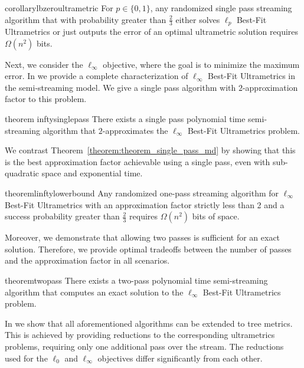 \documentclass{article}
\begin{document}
\begin{restatable}{corollary}{lbzeroultrametric}
    For $p \in \{0,1\}$, any randomized single pass streaming algorithm that with probability greater than $\frac{2}{3}$ either solves $\ell_p$ Best-Fit Ultrametrics or just outputs the error of an optimal ultrametric solution requires $\Omega(n^2)$ bits.
\end{restatable}

Next, we consider the $\ell_\infty$ objective, where the goal is to minimize the maximum error.
In  we provide a complete characterization of $\ell_\infty$ Best-Fit Ultrametrics in the semi-streaming model.
We give a single pass algorithm with $2$-approximation factor to this problem.

\begin{restatable}{theorem}
{inftysinglepass}\label{theorem:theorem_single_pass_md}
There exists a single pass polynomial time semi-streaming algorithm that $2$-approximates the $\ell_\infty$ Best-Fit Ultrametrics problem.
\end{restatable}

We contrast Theorem~\ref{theorem:theorem_single_pass_md} by showing that this is the best approximation factor achievable using a single pass, even with sub-quadratic space and exponential time.

\begin{restatable}{theorem}{linftylowerbound}
\label{theorem:l_infty_lower_bound}
Any randomized one-pass streaming algorithm for \(\ell_\infty\) Best-Fit Ultrametrics with an approximation factor strictly less than 2 and a success probability greater than \(\frac{2}{3}\) requires \(\Omega(n^2)\) bits of space.
\end{restatable}

Moreover, we demonstrate that allowing two passes is sufficient for an exact solution.
Therefore, we provide optimal tradeoffs between the number of passes and the approximation factor in all scenarios.

\begin{restatable}{theorem}{twopass}\label{theorem:twopassexact}
There exists a two-pass polynomial time semi-streaming algorithm that
computes an exact solution to the $\ell_\infty$ Best-Fit Ultrametrics problem.
\end{restatable}

In  we show that all aforementioned algorithms can be extended to tree metrics.
This is achieved by providing reductions to the corresponding ultrametrics problems, requiring only one additional pass over the stream.
The reductions used for the $\ell_0$ and $\ell_\infty$ objectives differ significantly from each other. 
\end{document}
